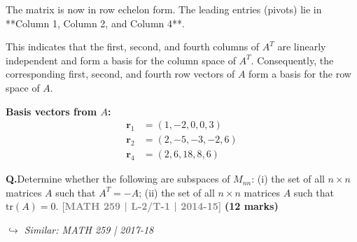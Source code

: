 \documentclass[12pt,a3paper]{article}
\newcommand{\yr}[1]{\hfill\textcolor{gray}{\small\textbf{[#1]}}}
\newcommand{\mk}[1]{\textcolor{orange!70!black}{\small\textbf{(#1 marks)}}}
\newcommand{\variant}[1]{\par\vspace{1pt}\textcolor{blue!50!black}%
  {\footnotesize\textit{$\hookrightarrow$ Similar: #1}}}
\newcounter{qnum}
\newcommand{\Q}[1]{%
  \needspace{4\baselineskip}
  \refstepcounter{qnum}
  \vspace{6pt}
  \noindent\textbf{Q\theqnum.}\enspace #1\par
}
\begin{document}
\begin{tcolorbox}[enhanced,breakable,
  colback=cC!4,colframe=cC,boxrule=0.8pt,arc=5pt,
  title={\textbf{Answer --- Basis for the Row Space}},
  fonttitle=\bfseries\color{white},colbacktitle=cC]
The matrix is now in row echelon form. The leading entries (pivots) lie in **Column 1, Column 2, and Column 4**. 

This indicates that the first, second, and fourth columns of $A^T$ are linearly independent and form a basis for the column space of $A^T$. Consequently, the corresponding first, second, and fourth row vectors of $A$ form a basis for the row space of $A$.

\vspace{0.3cm}
\textbf{Basis vectors from $A$:}
\begin{align*}
\mathbf{r}_1 &= (1, -2, 0, 0, 3) \\
\mathbf{r}_2 &= (2, -5, -3, -2, 6) \\
\mathbf{r}_4 &= (2, 6, 18, 8, 6)
\end{align*}

\end{tcolorbox}

\Q{Determine whether the following are subspaces of $M_{nn}$: (i) the set of all $n \times n$ matrices $A$ such that $A^T = -A$; (ii) the set of all $n \times n$ matrices $A$ such that $\mathrm{tr}(A) = 0$.
\yr{MATH 259 | L-2/T-1 | 2014-15} \mk{12}
\variant{MATH 259 | 2017-18}}
\end{document}
